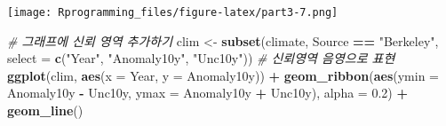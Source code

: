 \documentclass[10pt,]{krantz}
\makeatletter
\newenvironment{Shaded}{\begin{snugshade}}{\end{snugshade}}
\newcommand{\KeywordTok}[1]{\textcolor[rgb]{0.13,0.29,0.53}{\textbf{#1}}}
\newcommand{\DataTypeTok}[1]{\textcolor[rgb]{0.13,0.29,0.53}{#1}}
\newcommand{\DecValTok}[1]{\textcolor[rgb]{0.00,0.00,0.81}{#1}}
\newcommand{\FloatTok}[1]{\textcolor[rgb]{0.00,0.00,0.81}{#1}}
\newcommand{\StringTok}[1]{\textcolor[rgb]{0.31,0.60,0.02}{#1}}
\newcommand{\CommentTok}[1]{\textcolor[rgb]{0.56,0.35,0.01}{\textit{#1}}}
\newcommand{\OperatorTok}[1]{\textcolor[rgb]{0.81,0.36,0.00}{\textbf{#1}}}
\newcommand{\NormalTok}[1]{#1}
\newenvironment{kframe}{%
\medskip{}
\setlength{\fboxsep}{.8em}
 \def\at@end@of@kframe{}%
 \ifinner\ifhmode%
  \def\at@end@of@kframe{\end{minipage}}%
  \begin{minipage}{\columnwidth}%
 \fi\fi%
 \def\FrameCommand##1{\hskip\@totalleftmargin \hskip-\fboxsep
 \colorbox{shadecolor}{##1}\hskip-\fboxsep
     \hskip-\linewidth \hskip-\@totalleftmargin \hskip\columnwidth}%
 \MakeFramed {\advance\hsize-\width
   \@totalleftmargin\z@ \linewidth\hsize
   \@setminipage}}%
 {\par\unskip\endMakeFramed%
 \at@end@of@kframe}
\renewenvironment{Shaded}{\begin{kframe}}{\end{kframe}}
\theoremstyle{definition}
\theoremstyle{definition}
\theoremstyle{remark}
\makeatother
\begin{document}
\begin{Shaded}
\end{Shaded}

\texttt{[image: Rprogramming\_files/figure-latex/part3-7.png]}

\begin{Shaded}
\begin{Highlighting}[]


\CommentTok{# 그래프에 신뢰 영역 추가하기}
\NormalTok{clim <-}\StringTok{ }\KeywordTok{subset}\NormalTok{(climate, Source }\OperatorTok{==}\StringTok{ "Berkeley"}\NormalTok{, }\DataTypeTok{select =} \KeywordTok{c}\NormalTok{(}\StringTok{"Year"}\NormalTok{, }\StringTok{"Anomaly10y"}\NormalTok{, }\StringTok{"Unc10y"}\NormalTok{))}
\CommentTok{# 신뢰영역 음영으로 표현 }
\KeywordTok{ggplot}\NormalTok{(clim, }\KeywordTok{aes}\NormalTok{(}\DataTypeTok{x =}\NormalTok{ Year, }\DataTypeTok{y =}\NormalTok{ Anomaly10y)) }\OperatorTok{+}\StringTok{ }
\StringTok{  }\KeywordTok{geom_ribbon}\NormalTok{(}\KeywordTok{aes}\NormalTok{(}\DataTypeTok{ymin =}\NormalTok{ Anomaly10y }\OperatorTok{-}\StringTok{ }\NormalTok{Unc10y, }\DataTypeTok{ymax =}\NormalTok{ Anomaly10y }\OperatorTok{+}\StringTok{ }\NormalTok{Unc10y), }\DataTypeTok{alpha =} \FloatTok{0.2}\NormalTok{) }\OperatorTok{+}
\StringTok{  }\KeywordTok{geom_line}\NormalTok{()}
\end{Highlighting}
\end{Shaded}
\end{document}
